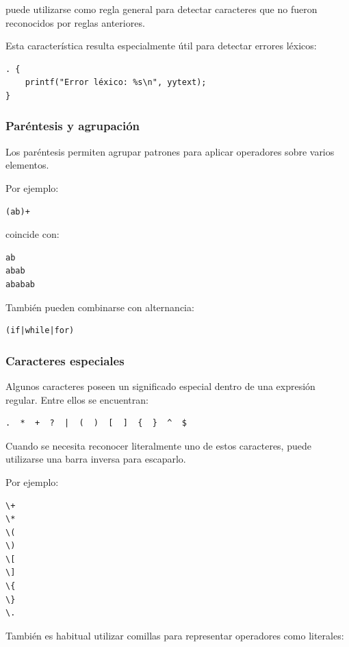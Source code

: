 \documentclass{article}
\begin{document}
puede utilizarse como regla general para detectar caracteres que no fueron
reconocidos por reglas anteriores.

Esta característica resulta especialmente útil para detectar errores
léxicos:

\begin{verbatim}
. {
    printf("Error léxico: %s\n", yytext);
}
\end{verbatim}

\subsubsection{Paréntesis y agrupación}

Los paréntesis permiten agrupar patrones para aplicar operadores sobre
varios elementos.

Por ejemplo:

\begin{verbatim}
(ab)+
\end{verbatim}

coincide con:

\begin{verbatim}
ab
abab
ababab
\end{verbatim}

También pueden combinarse con alternancia:

\begin{verbatim}
(if|while|for)
\end{verbatim}

\subsubsection{Caracteres especiales}

Algunos caracteres poseen un significado especial dentro de una
expresión regular. Entre ellos se encuentran:

\begin{verbatim}
.  *  +  ?  |  (  )  [  ]  {  }  ^  $
\end{verbatim}

Cuando se necesita reconocer literalmente uno de estos caracteres,
puede utilizarse una barra inversa para escaparlo.

Por ejemplo:

\begin{verbatim}
\+
\*
\(
\)
\[
\]
\{
\}
\.
\end{verbatim}

También es habitual utilizar comillas para representar operadores como
literales:
\end{document}
